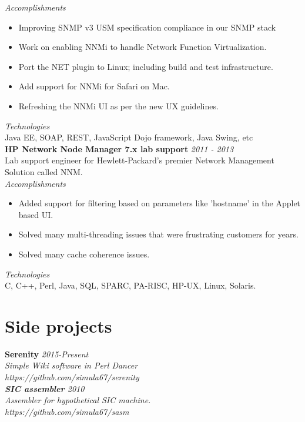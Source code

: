 \documentclass[line,margin]{res}
\begin{document}
\begin{resume}
{\it{Accomplishments}}\\
\begin{itemize}
\item Improving SNMP v3 USM specification compliance in our SNMP stack
\item Work on enabling NNMi to handle Network Function Virtualization.
\item Port the NET plugin to Linux; including build and test infrastructure.
\item Add support for NNMi for Safari on Mac.
\item Refreshing the NNMi UI as per the new UX guidelines.
\end{itemize}

{\it{Technologies}}\\
Java EE, SOAP, REST, JavaScript Dojo framework, Java Swing, etc\\

{\bf HP Network Node Manager 7.x lab support} \hfill {\it{2011 - 2013}}\\
Lab support engineer for Hewlett-Packard's premier Network Management Solution called NNM.\\

{\it{Accomplishments}}\\
\begin{itemize}
\item Added support for filtering based on parameters like 'hostname' in the Applet based UI.
\item Solved many multi-threading issues that were frustrating customers for years.
\item Solved many cache coherence issues.
\end{itemize}

{\it{Technologies}}\\
C, C++, Perl, Java, SQL, SPARC, PA-RISC, HP-UX, Linux, Solaris.

\section{Side projects}
{\bf Serenity} \hfill \it{2015-Present}\\
Simple Wiki software in Perl Dancer\\
https://github.com/simula67/serenity\\

{\bf SIC assembler} \hfill \it{2010}\\ 
Assembler for hypothetical SIC machine.\\
https://github.com/simula67/sasm\\



\end{resume}
\end{document}
